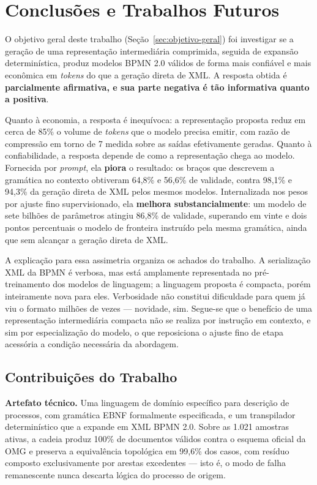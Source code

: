 \chapter{Conclusões e Trabalhos Futuros}
\label{chap:conclusoes-e-trabalhos-futuros}

O objetivo geral deste trabalho (Seção~\ref{sec:objetivo-geral}) foi investigar se a geração de uma representação intermediária comprimida, seguida de expansão determinística, produz modelos BPMN 2.0 válidos de forma mais confiável e mais econômica em \textit{tokens} do que a geração direta de XML. A resposta obtida é \textbf{parcialmente afirmativa, e sua parte negativa é tão informativa quanto a positiva}.

Quanto à economia, a resposta é inequívoca: a representação proposta reduz em cerca de 85\% o volume de \textit{tokens} que o modelo precisa emitir, com razão de compressão em torno de 7 medida sobre as saídas efetivamente geradas. Quanto à confiabilidade, a resposta depende de como a representação chega ao modelo. Fornecida por \textit{prompt}, ela \textbf{piora} o resultado: os braços que descrevem a gramática no contexto obtiveram 64,8\% e 56,6\% de validade, contra 98,1\% e 94,3\% da geração direta de XML pelos mesmos modelos. Internalizada nos pesos por ajuste fino supervisionado, ela \textbf{melhora substancialmente}: um modelo de sete bilhões de parâmetros atingiu 86,8\% de validade, superando em vinte e dois pontos percentuais o modelo de fronteira instruído pela mesma gramática, ainda que sem alcançar a geração direta de XML.

A explicação para essa assimetria organiza os achados do trabalho. A serialização XML da BPMN é verbosa, mas está amplamente representada no pré-treinamento dos modelos de linguagem; a linguagem proposta é compacta, porém inteiramente nova para eles. Verbosidade não constitui dificuldade para quem já viu o formato milhões de vezes --- novidade, sim. Segue-se que o benefício de uma representação intermediária compacta não se realiza por instrução em contexto, e sim por especialização do modelo, o que reposiciona o ajuste fino de etapa acessória a condição necessária da abordagem.

\section{Contribuições do Trabalho}
\label{sec:contribuicoes-do-trabalho}

\textbf{Artefato técnico.} Uma linguagem de domínio específico para descrição de processos, com gramática EBNF formalmente especificada, e um transpilador determinístico que a expande em XML BPMN 2.0. Sobre as 1.021 amostras ativas, a cadeia produz 100\% de documentos válidos contra o esquema oficial da OMG e preserva a equivalência topológica em 99,6\% dos casos, com resíduo composto exclusivamente por arestas excedentes --- isto é, o modo de falha remanescente nunca descarta lógica do processo de origem.

